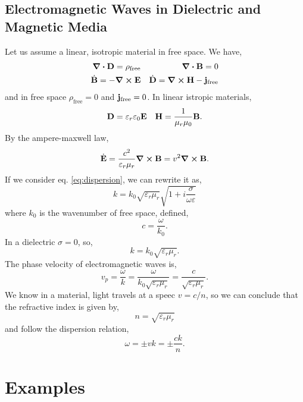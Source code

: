 \documentclass{book}
\begin{document}
\section{Electromagnetic Waves in Dielectric and Magnetic Media}
Let us assume a linear, isotropic material in free space. We have,
\begin{align}
	\div{\vb{D}} = \rho_{\text{free}} && \div{\vb{B}} = 0 \\
	\Dot{\vb{B}} = - \curl{\vb{E}} && \Dot{\vb{D}} = \curl{\vb{H}} - \vb{j}_{\text{free}}
\end{align}
and in free space $\rho_{\text{free}} = 0$ and $\vb{j}_{\text{free}} = 0$. In linear istropic materials,
\begin{align}
	\vb{D} = \varepsilon_r \varepsilon_0  \vb{E} && \vb{H}= \frac{1}{\mu_r\mu_0}\vb{B}.
\end{align}
By the ampere-maxwell law,
\begin{equation}
	\Dot{\vb{E}} = \frac{c^2}{\varepsilon_r\mu_r}\curl{\vb{B}} = v^2 \curl{\vb{B}}.
\end{equation}
If we consider eq. \eqref{eq:dispersion}, we can rewrite it as,
\begin{equation}
	k = k_0 \sqrt{\varepsilon_r\mu_r}\sqrt{1 + i\frac{\sigma}{\omega \varepsilon}}
\end{equation}
where $k_0$ is the wavenumber of free space, defined,
\begin{equation}
	c = \frac{\omega}{k_0}.
\end{equation}
In a dielectric $\sigma =0$, so,
\begin{equation}
	k = k_0 \sqrt{\varepsilon_r \mu_r}.
\end{equation}
The phase velocity of electromagnetic waves is,
\begin{equation}
	v_p = \frac{\omega}{k} = \frac{\omega}{k_0\sqrt{\varepsilon_r\mu_r}} = \frac{c}{\sqrt{\varepsilon_r\mu_r}}.
\end{equation}
We know in a material, light travels at a speec $v = c/n$, so we can conclude that the refractive index is given by,
\begin{equation}
	\boxed{n = \sqrt{\varepsilon_r\mu_r}}
\end{equation}
and follow the dispersion relation,
\begin{equation}
	\boxed{\omega = \pm vk = \pm \frac{ck}{n}}.
\end{equation}
\appendix 
\chapter{Examples}
\end{document}
